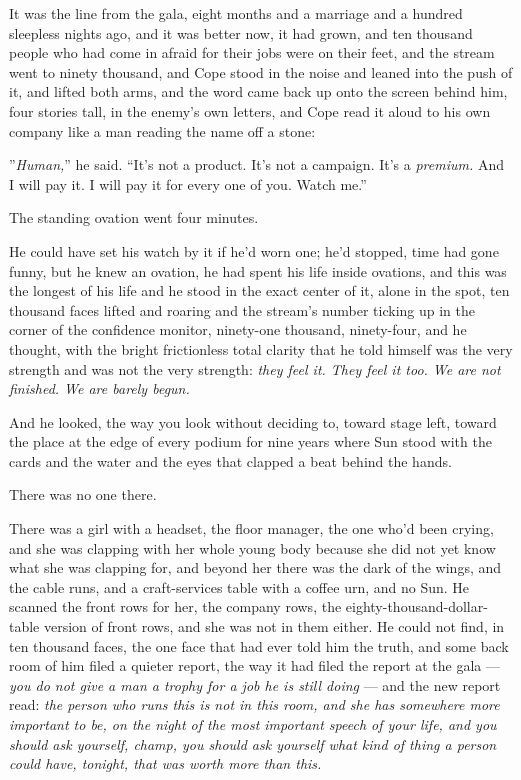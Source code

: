 \documentclass[11pt,openany]{book}
\newcommand{\scenebreak}{\par\vspace{0.5\baselineskip}\begin{center}\textasteriskcentered\quad\textasteriskcentered\quad\textasteriskcentered\end{center}\vspace{0.5\baselineskip}\par}
\begin{document}
It was the line from the gala, eight months and a marriage and a hundred sleepless nights ago, and it was better now, it had grown, and ten thousand people who had come in afraid for their jobs were on their feet, and the stream went to ninety thousand, and Cope stood in the noise and leaned into the push of it, and lifted both arms, and the word came back up onto the screen behind him, four stories tall, in the enemy's own letters, and Cope read it aloud to his own company like a man reading the name off a stone:

''\textit{Human,}'' he said. ``It's not a product. It's not a campaign. It's a \textit{premium.} And I will pay it. I will pay it for every one of you. Watch me.''


\scenebreak


The standing ovation went four minutes.

He could have set his watch by it if he'd worn one; he'd stopped, time had gone funny, but he knew an ovation, he had spent his life inside ovations, and this was the longest of his life and he stood in the exact center of it, alone in the spot, ten thousand faces lifted and roaring and the stream's number ticking up in the corner of the confidence monitor, ninety-one thousand, ninety-four, and he thought, with the bright frictionless total clarity that he told himself was the very strength and was not the very strength: \textit{they feel it. They feel it too. We are not finished. We are barely begun.}

And he looked, the way you look without deciding to, toward stage left, toward the place at the edge of every podium for nine years where Sun stood with the cards and the water and the eyes that clapped a beat behind the hands.

There was no one there.

There was a girl with a headset, the floor manager, the one who'd been crying, and she was clapping with her whole young body because she did not yet know what she was clapping for, and beyond her there was the dark of the wings, and the cable runs, and a craft-services table with a coffee urn, and no Sun. He scanned the front rows for her, the company rows, the eighty-thousand-dollar-table version of front rows, and she was not in them either. He could not find, in ten thousand faces, the one face that had ever told him the truth, and some back room of him filed a quieter report, the way it had filed the report at the gala --- \textit{you do not give a man a trophy for a job he is still doing} --- and the new report read: \textit{the person who runs this is not in this room, and she has somewhere more important to be, on the night of the most important speech of your life, and you should ask yourself, champ, you should ask yourself what kind of thing a person could have, tonight, that was worth more than this.}
\end{document}
